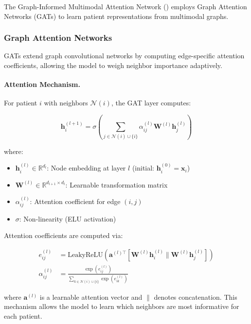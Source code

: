 
The Graph-Informed Multimodal Attention Network (\giman) employs Graph Attention Networks (GATs)\cite{velickovic2018graph} to learn patient representations from multimodal graphs.

\subsubsection{Graph Attention Networks}

GATs extend graph convolutional networks by computing edge-specific attention coefficients, allowing the model to weigh neighbor importance adaptively\cite{velickovic2018graph}.

\paragraph{Attention Mechanism.}
For patient $i$ with neighbors $\mathcal{N}(i)$, the GAT layer computes:

\begin{equation}
    \mathbf{h}_i^{(l+1)} = \sigma \left( \sum_{j \in \mathcal{N}(i) \cup \{i\}} \alpha_{ij}^{(l)} \mathbf{W}^{(l)} \mathbf{h}_j^{(l)} \right)
\end{equation}

where:
\begin{itemize}
    \item $\mathbf{h}_i^{(l)} \in \mathbb{R}^{d_l}$: Node embedding at layer $l$ (initial: $\mathbf{h}_i^{(0)} = \mathbf{x}_i$)
    \item $\mathbf{W}^{(l)} \in \mathbb{R}^{d_{l+1} \times d_l}$: Learnable transformation matrix
    \item $\alpha_{ij}^{(l)}$: Attention coefficient for edge $(i,j)$
    \item $\sigma$: Non-linearity (ELU activation\cite{clevert2015fast})
\end{itemize}

Attention coefficients are computed via:

\begin{align}
    e_{ij}^{(l)} &= \text{LeakyReLU}(\mathbf{a}^{(l)\top} [\mathbf{W}^{(l)} \mathbf{h}_i^{(l)} \| \mathbf{W}^{(l)} \mathbf{h}_j^{(l)}]) \\
    \alpha_{ij}^{(l)} &= \frac{\exp(e_{ij}^{(l)})}{\sum_{k \in \mathcal{N}(i) \cup \{i\}} \exp(e_{ik}^{(l)})}
\end{align}

where $\mathbf{a}^{(l)}$ is a learnable attention vector and $\|$ denotes concatenation. This mechanism allows the model to learn which neighbors are most informative for each patient.


